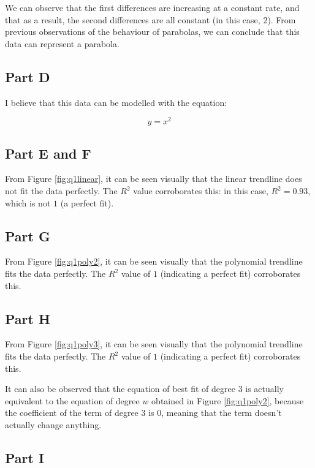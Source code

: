 \documentclass[12pt]{article}
\begin{document}
We can observe that the first differences are increasing at a constant rate, and that as a result, the second differences are all constant (in this case, $2$). From previous observations of the behaviour of parabolas, we can conclude that this data can represent a parabola.

\subsection{Part D}

I believe that this data can be modelled with the equation:

\[
\boxed{
y = x^2
}
\]

\subsection{Part E and F}

From Figure \ref{fig:q1linear}, it can be seen visually that the linear trendline does not fit the data perfectly. The $R^2$ value corroborates this: in this case, $R^2 = 0.93$, which is not $1$ (a perfect fit).

\subsection{Part G}

From Figure \ref{fig:q1poly2}, it can be seen visually that the polynomial trendline fits the data perfectly. The $R^2$ value of $1$ (indicating a perfect fit) corroborates this.

\subsection{Part H}

From Figure \ref{fig:q1poly3}, it can be seen visually that the polynomial trendline fits the data perfectly. The $R^2$ value of $1$ (indicating a perfect fit) corroborates this.

It can also be observed that the equation of best fit of degree $3$ is actually equivalent to the equation of degree $w$ obtained in Figure \ref{fig:q1poly2}, because the coefficient of the term of degree $3$ is $0$, meaning that the term doesn't actually change anything.

\subsection{Part I}
\end{document}
